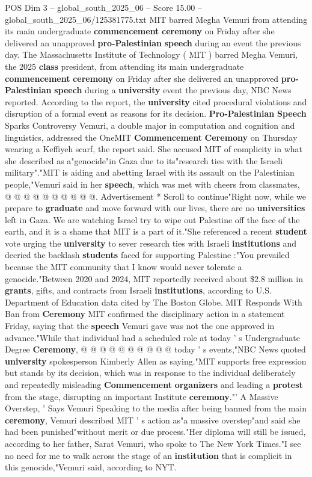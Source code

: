 \begin{textsample}{POS Dim 3 – global\_south\_2025\_06 – Score 15.00 – global\_south\_2025\_06/125381775.txt}  \label{ex:f3_pos_197}
MIT barred Megha Vemuri from attending its main undergraduate \textbf{commencement} \textbf{ceremony} on Friday after she delivered an unapproved \textbf{pro-Palestinian} \textbf{speech} during an event the previous day.
The Massachusetts Institute of Technology ( MIT ) barred Megha Vemuri, the 2025 \textbf{class} president, from attending its main undergraduate \textbf{commencement} \textbf{ceremony} on Friday after she delivered an unapproved \textbf{pro-Palestinian} \textbf{speech} during a \textbf{university} event the previous day, NBC News reported.
According to the report, the \textbf{university} cited procedural violations and disruption of a formal event as reasons for its decision. \textbf{Pro-Palestinian} \textbf{Speech} Sparks Controversy Vemuri, a double major in computation and cognition and linguistics, addressed the OneMIT \textbf{Commencement} \textbf{Ceremony} on Thursday wearing a Keffiyeh scarf, the report said.
She accused MIT of complicity in what she described as a"genocide"in Gaza due to its"research ties with the Israeli military"."MIT is aiding and abetting Israel with its assault on the Palestinian people,"Vemuri said in her \textbf{speech}, which was met with cheers from classmates, @ @ @ @ @ @ @ @ @ @.
Advertisement * Scroll to continue"Right now, while we prepare to \textbf{graduate} and move forward with our lives, there are no \textbf{universities} left in Gaza.
We are watching Israel try to wipe out Palestine off the face of the earth, and it is a shame that MIT is a part of it."She referenced a recent \textbf{student} vote urging the \textbf{university} to sever research ties with Israeli \textbf{institutions} and decried the backlash \textbf{students} faced for supporting Palestine :"You prevailed because the MIT community that I know would never tolerate a genocide."Between 2020 and 2024, MIT reportedly received about \$2.8 million in \textbf{grants}, gifts, and contracts from Israeli \textbf{institutions}, according to U.S.
Department of Education data cited by The Boston Globe.
MIT Responds With Ban from \textbf{Ceremony} MIT confirmed the disciplinary action in a statement Friday, saying that the \textbf{speech} Vemuri gave was not the one approved in advance."While that individual had a scheduled role at today ' s Undergraduate Degree \textbf{Ceremony}, @ @ @ @ @ @ @ @ @ @ today ' s events,"NBC News quoted \textbf{university} spokesperson Kimberly Allen as saying."MIT supports free expression but stands by its decision, which was in response to the individual deliberately and repeatedly misleading \textbf{Commencement} \textbf{organizers} and leading a \textbf{protest} from the stage, disrupting an important Institute \textbf{ceremony}."' A Massive Overstep, ' Says Vemuri Speaking to the media after being banned from the main \textbf{ceremony}, Vemuri described MIT ' s action as"a massive overstep"and said she had been punished"without merit or due process."Her diploma will still be issued, according to her father, Sarat Vemuri, who spoke to The New York Times."I see no need for me to walk across the stage of an \textbf{institution} that is complicit in this genocide,"Vemuri said, according to NYT.

\end{textsample}

